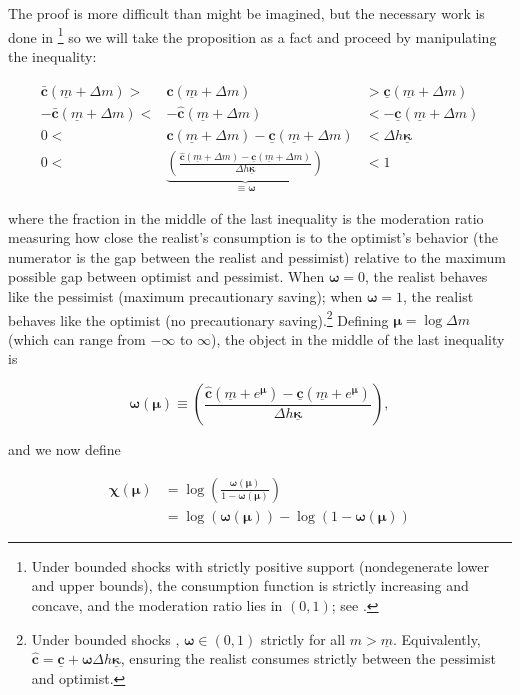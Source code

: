 \documentclass[preprint,authoryear]{elsarticle}
\newcommand{\mNrm}{m}
\newcommand{\cFunc}{\mathbf{c}}
\newcommand{\cFuncOpt}{\bar{\cFunc}}
\newcommand{\hNrm}{h}
\newcommand{\MPC}{\boldsymbol{\kappa}}
\newcommand{\MPCmin}{\underline{\MPC}}
\newcommand{\mNrmMin}{\underline{\mNrm}}
\newcommand{\logmNrmEx}{\boldsymbol{\mu}}
\newcommand{\modRte}{\boldsymbol{\omega}}
\newcommand{\mNrmEx}{\Delta \mNrm}
\newcommand{\hNrmEx}{\Delta \hNrm}
\newcommand{\cFuncPes}{\underline{\cFunc}}
\newcommand{\cFuncReal}{\hat{\cFunc}}
\newcommand{\logitModRte}{\boldsymbol{\chi}}
\begin{document}
The proof is more difficult than might be imagined, but the necessary work is
done in \citet{CarrollShanker2024}\footnote{Under bounded shocks with strictly positive support (nondegenerate lower and upper bounds), the consumption function is strictly increasing and concave, and the moderation ratio lies in $(0,1)$; see \citet{CarrollShanker2024}.} so we will take the proposition as
a fact and proceed by manipulating the inequality:

\begin{equation}
\begin{array}{rcl}
\cFuncOpt(\mNrmMin+\mNrmEx) > & \cFuncReal(\mNrmMin+\mNrmEx) & > \cFuncPes(\mNrmMin+\mNrmEx) \\
-\cFuncOpt(\mNrmMin+\mNrmEx) < & -\cFuncReal(\mNrmMin+\mNrmEx) & < -\cFuncPes(\mNrmMin+\mNrmEx) \\
0 < & \cFuncReal(\mNrmMin+\mNrmEx)-\cFuncPes(\mNrmMin+\mNrmEx) & < \hNrmEx \MPCmin \\
0 < & \underbrace{\left(\frac{\cFuncReal(\mNrmMin+\mNrmEx)-\cFuncPes(\mNrmMin+\mNrmEx)}{\hNrmEx \MPCmin}\right)}_{\equiv \modRte} & < 1
\end{array}
\end{equation}

where the fraction in the middle of the last inequality is the moderation ratio
measuring how close the realist's consumption is to the optimist's behavior
(the numerator is the gap between the realist and pessimist) relative to the
maximum possible gap between optimist and pessimist. When $\modRte=0$, the
realist behaves like the pessimist (maximum precautionary saving); when
$\modRte=1$, the realist behaves like the optimist (no precautionary saving).\footnote{Under bounded shocks \citep{CarrollKimball1996, CarrollShanker2024}, $\modRte\in(0,1)$ strictly for all $\mNrm > \mNrmMin$. Equivalently, $\cFuncReal = \cFuncPes + \modRte\hNrmEx \MPCmin$, ensuring the realist consumes strictly between the pessimist and optimist.} Defining
$\logmNrmEx = \log \mNrmEx$ (which can range from $-\infty$ to
$\infty$), the object in the middle of the last inequality is

\begin{equation}
\label{eq:modRte}
\modRte(\logmNrmEx) \equiv  \left(\frac{\cFuncReal(\mNrmMin+e^{\logmNrmEx})-\cFuncPes(\mNrmMin+e^{\logmNrmEx})}{\hNrmEx \MPCmin}\right),
\end{equation}

and we now define

\begin{equation}
\label{eq:chi}
\begin{aligned}
\logitModRte(\logmNrmEx) &= \log \left(\frac{\modRte(\logmNrmEx)}{1-\modRte(\logmNrmEx)}\right) \\
&= \log(\modRte(\logmNrmEx)) - \log(1-\modRte(\logmNrmEx))
\end{aligned}
\end{equation}
\end{document}
